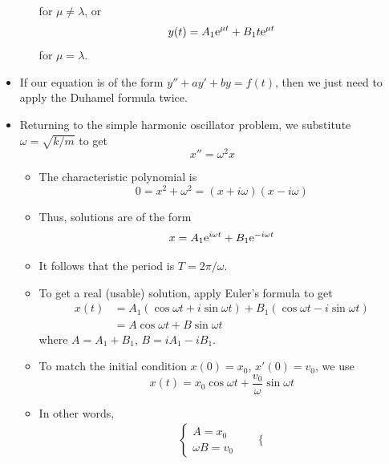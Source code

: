 \documentclass[../notes.tex]{subfiles}
\begin{document}
\begin{itemize}
\begin{itemize}
        for $\mu\neq\lambda$, or
        \begin{equation*}
            y(t) = A_1\e[\mu t]+B_1t\e[\mu t]
        \end{equation*}
        for $\mu=\lambda$.
    \end{itemize}
    \item If our equation is of the form $y''+ay'+by=f(t)$, then we just need to apply the Duhamel formula twice.
    \item Returning to the simple harmonic oscillator problem, we substitute $\omega=\sqrt{k/m}$ to get
    \begin{equation*}
        x'' = \omega^2x
    \end{equation*}
    \begin{itemize}
        \item The characteristic polynomial is
        \begin{equation*}
            0 = x^2+\omega^2
            = (x+i\omega)(x-i\omega)
        \end{equation*}
        \item Thus, solutions are of the form
        \begin{equation*}
            x = A_1\e[i\omega t]+B_1\e[-i\omega t]
        \end{equation*}
        \item It follows that the period is $T=2\pi/\omega$.
        \item To get a real (usable) solution, apply Euler's formula to get
        \begin{align*}
            x(t) &= A_1(\cos\omega t+i\sin\omega t)+B_1(\cos\omega t-i\sin\omega t)\\
            &= A\cos\omega t+B\sin\omega t
        \end{align*}
        where $A=A_1+B_1$, $B=iA_1-iB_1$.
        \item To match the initial condition $x(0)=x_0$, $x'(0)=v_0$, we use
        \begin{equation*}
            x(t) = x_0\cos\omega t+\frac{v_0}{\omega}\sin\omega t
        \end{equation*}
        \item In other words,
        \begin{align*}
            &
            \begin{cases}
                A=x_0\\
                \omega B=v_0
            \end{cases}
            &&
            \begin{cases}

\end{cases}
\end{align*}
\end{itemize}
\end{itemize}
\end{document}
